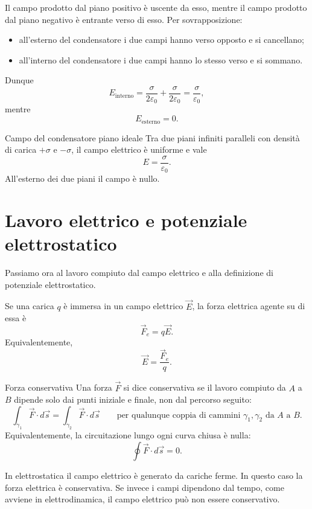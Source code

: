 \documentclass[a4paper]{article}
\begin{document}
Il campo prodotto dal piano positivo è uscente da esso, mentre il campo prodotto dal piano negativo è entrante verso di esso. Per sovrapposizione:
\begin{itemize}
    \item all'esterno del condensatore i due campi hanno verso opposto e si cancellano;
    \item all'interno del condensatore i due campi hanno lo stesso verso e si sommano.
\end{itemize}
Dunque
\[
    E_{\mathrm{interno}}=\frac{\sigma}{2\varepsilon_0}+\frac{\sigma}{2\varepsilon_0}=\frac{\sigma}{\varepsilon_0},
\]
mentre
\[
    E_{\mathrm{esterno}}=0.
\]

\begin{snippetproposition}{Campo del condensatore piano ideale}
    Tra due piani infiniti paralleli con densità di carica \(+\sigma\) e \(-\sigma\), il campo elettrico è uniforme e vale
    \[
        E=\frac{\sigma}{\varepsilon_0}.
    \]
    All'esterno dei due piani il campo è nullo.
\end{snippetproposition}

\section{Lavoro elettrico e potenziale elettrostatico}

Passiamo ora al lavoro compiuto dal campo elettrico e alla definizione di potenziale elettrostatico.

Se una carica \(q\) è immersa in un campo elettrico \(\vec{E}\), la forza elettrica agente su di essa è
\[
    \vec{F}_e=q\vec{E}.
\]
Equivalentemente,
\[
    \vec{E}=\frac{\vec{F}_e}{q}.
\]

\begin{snippetdefinition}{Forza conservativa}
    Una forza \(\vec{F}\) si dice conservativa se il lavoro compiuto da \(A\) a \(B\) dipende solo dai punti iniziale e finale, non dal percorso seguito:
    \[
        \int_{\gamma_1} \vec{F}\cdot d\vec{s}
        =
        \int_{\gamma_2} \vec{F}\cdot d\vec{s}
        \qquad\text{per qualunque coppia di cammini \(\gamma_1,\gamma_2\) da \(A\) a \(B\)}.
    \]
    Equivalentemente, la circuitazione lungo ogni curva chiusa è nulla:
    \[
        \oint \vec{F}\cdot d\vec{s}=0.
    \]
\end{snippetdefinition}

In elettrostatica il campo elettrico è generato da cariche ferme. In questo caso la forza elettrica è conservativa. Se invece i campi dipendono dal tempo, come avviene in elettrodinamica, il campo elettrico può non essere conservativo.
\end{document}
